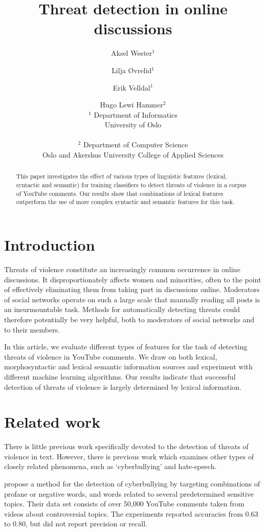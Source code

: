 \documentclass[11pt,letterpaper]{article}
\title{Threat detection in online discussions}
\author{Aksel Wester$^1$ \and Lilja Øvrelid$^1$ \and Erik Velldal$^1$ \and Hugo Lewi Hammer$^2$\\[1ex]
  ${}^1$ Department of Informatics\\ University of Oslo\\
  {\smaller {\tt \{aksellw, liljao, erikve\}@ifi.uio.no}}\\[1ex]
${}^2$ Department of Computer Science\\ Oslo and Akershus University College of Applied Sciences\\
{\smaller{\tt hugo.hammer@hioa.no}}}
\date{}
\begin{document}
\maketitle

\begin{abstract}
This paper investigates the effect of various types of linguistic features (lexical, syntactic and semantic) for training classifiers to detect threats of violence in a corpus of YouTube comments. %
Our results show that combinations of lexical features outperform the use of more complex syntactic and semantic features for this task.
\end{abstract}

\section{Introduction}
\label{sec:intro}
Threats of violence constitute an increasingly common occurrence in online discussions. It disproportionately affects women and minorities, often to the point of effectively eliminating them from taking part in discussions online. Moderators of social networks operate on such a large scale that manually reading all posts is an insurmountable task. Methods for automatically detecting threats could therefore potentially be very helpful, both to moderators of social networks and to their members.

In this article, we evaluate different types of features for the task of detecting threats of violence in YouTube comments. We draw on both lexical, morphosyntactic and lexical semantic information sources and experiment with different machine learning algorithms. Our results indicate that successful detection of threats of violence is largely determined by lexical information.

\section{Related work}
\label{sec:prev}
There is little previous work specifically devoted to the detection of threats of violence in text. However, there is previous work which examines other types of closely related phenomena, such as `cyberbullying' and hate-speech.

 propose a method for the detection of cyberbullying by targeting combinations of profane or negative words, and words related to several predetermined sensitive topics. Their data set consists of over 50,000 YouTube comments taken from videos about controversial topics. %
The experiments reported accuracies from 0.63 to 0.80, but did not report precision or recall.
\end{document}
